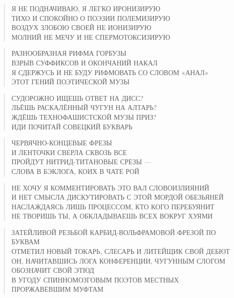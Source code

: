 \poemtitle{***}
\begin{verse}
Я НЕ ПОДНАЧИВАЮ, Я ЛЕГКО ИРОНИЗИРУЮ\\
ТИХО И СПОКОЙНО О ПОЭЗИИ ПОЛЕМИЗИРУЮ\\
ВОЗДУХ ЗЛОБОЮ СВОЕЙ НЕ ИОНИЗИРУЮ\\
МОЛНИЙ НЕ МЕЧУ И НЕ СПЕРМОТОКСИЗИРУЮ
\end{verse}

\poemtitle{***}
\begin{verse}
РАЗНООБРАЗНАЯ РИФМА ГОРБУЗЫ\\
ВЗРЫВ СУФФИКСОВ И ОКОНЧАНИЙ НАКАЛ\\
Я СДЕРЖУСЬ И НЕ БУДУ РИФМОВАТЬ СО СЛОВОМ «АНАЛ»\\
ЭТОТ ГЕНИЙ ПОЭТИЧЕСКОЙ МУЗЫ
\end{verse}

\poemtitle{***}
\begin{verse}
СУДОРОЖНО ИЩЕШЬ ОТВЕТ  НА ДИСС?\\
ЛЬЁШЬ РАСКАЛЁННЫЙ ЧУГУН НА АЛТАРЬ?\\
ЖДЁШЬ ТЕХНОФАШИСТСКОЙ МУЗЫ ПРИЗ?\\
ИДИ ПОЧИТАЙ СОВЕЦКИЙ БУКВАРЬ
\end{verse}

\poemtitle{***}
\begin{verse}
ЧЕРВЯЧНО-КОНЦЕВЫЕ ФРЕЗЫ\\
И ЛЕНТОЧКИ СВЕРЛА СКВОЗЬ ВСЕ\\
ПРОЙДУТ НИТРИД-ТИТАНОВЫЕ СРЕЗЫ —\\
СЛОВА В БЭКЛОГА, КОИХ В ЧАТЕ РОЙ
\end{verse}

\poemtitle{***}
\begin{verse}
НЕ ХОЧУ Я КОММЕНТИРОВАТЬ ЭТО ВАЛ СЛОВОИЗЛИЯНИЙ\\
И НЕТ СМЫСЛА ДИСКУТИРОВАТЬ С ЭТОЙ МОРДОЙ ОБЕЗЬЯНЕЙ\\
НАСЛАЖДАЯСЬ ЛИШЬ ПРОЦЕССОМ, КТО КОГО ПЕРЕБУЯНИТ\\
НЕ ТВОРИШЬ ТЫ, А ОБКЛАДЫВАЕШЬ ВСЕХ ВОКРУГ ХУЯМИ
\end{verse}

\poemtitle{***}
\begin{verse}
ЗАТЕЙЛИВОЙ РЕЗЬБОЙ КАРБИД-ВОЛЬФРАМОВОЙ ФРЕЗОЙ ПО БУКВАМ\\
ОТМЕТИЛ НОВЫЙ ТОКАРЬ, СЛЕСАРЬ И ЛИТЕЙЩИК СВОЙ ДЕБЮТ\\
ОН, НАЧИТАВШИСЬ ЛОГА КОНФЕРЕНЦИИ, ЧУГУННЫМ СЛОГОМ ОБОЗНАЧИТ СВОЙ ЭТЮД\\
В УГОДУ СПИННОМОЗГОВЫМ ПОЭТОВ МЕСТНЫХ ПРОРЖАВЕВШИМ МУФТАМ
\end{verse}

